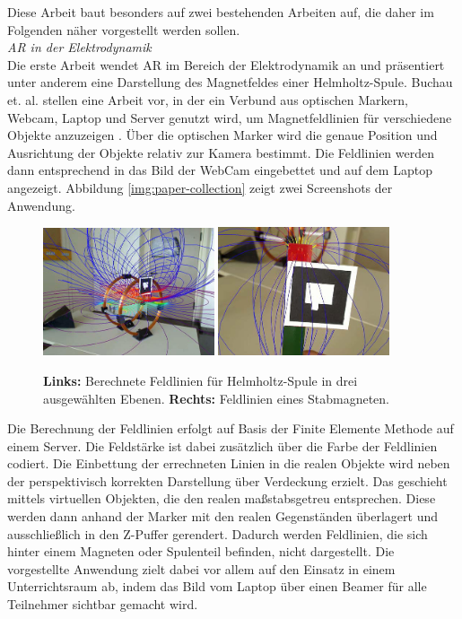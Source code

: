 Diese Arbeit baut besonders auf zwei bestehenden Arbeiten auf, die daher im Folgenden näher vorgestellt werden sollen.\\

\vspace{4px}
\textit{AR in der Elektrodynamik}\\
Die erste Arbeit wendet AR im Bereich der Elektrodynamik an und präsentiert unter anderem eine Darstellung des Magnetfeldes einer Helmholtz-Spule. Buchau et. al. stellen eine Arbeit vor, in der ein Verbund aus optischen Markern, Webcam, Laptop und Server genutzt wird, um Magnetfeldlinien für verschiedene Objekte anzuzeigen \cite{Buchau09}. Über die optischen Marker wird die genaue Position und Ausrichtung der Objekte relativ zur Kamera bestimmt. Die Feldlinien werden dann entsprechend in das Bild der WebCam eingebettet und auf dem Laptop angezeigt. Abbildung \ref{img:paper-collection} zeigt zwei Screenshots der Anwendung.\\

\begin{figure}[h!]
	\centering
	\includegraphics[width=0.45\textwidth]{images/papers/Buchau09.jpg}
	\hspace{0.05cm}
	\includegraphics[width=0.45\textwidth]{images/papers/Buchau09_Magnet_2.jpg}
	\caption{\textbf{Links:} Berechnete Feldlinien für Helmholtz-Spule in drei ausgewählten Ebenen. \textbf{Rechts: } Feldlinien eines Stabmagneten.\cite{Buchau09}}
\end{figure}

Die Berechnung der Feldlinien erfolgt auf Basis der Finite Elemente Methode auf einem Server. Die Feldstärke ist dabei zusätzlich über die Farbe der Feldlinien codiert. Die Einbettung der errechneten Linien in die realen Objekte wird neben der perspektivisch korrekten Darstellung über Verdeckung erzielt. Das geschieht mittels  virtuellen Objekten, die den realen maßstabsgetreu entsprechen. Diese werden dann anhand der Marker mit den realen Gegenständen überlagert und ausschließlich in den Z-Puffer gerendert. Dadurch werden Feldlinien, die sich hinter einem Magneten oder Spulenteil befinden, nicht dargestellt. Die vorgestellte Anwendung zielt dabei vor allem auf den Einsatz in einem Unterrichtsraum ab, indem das Bild vom Laptop über einen Beamer für alle Teilnehmer sichtbar gemacht wird.\\

